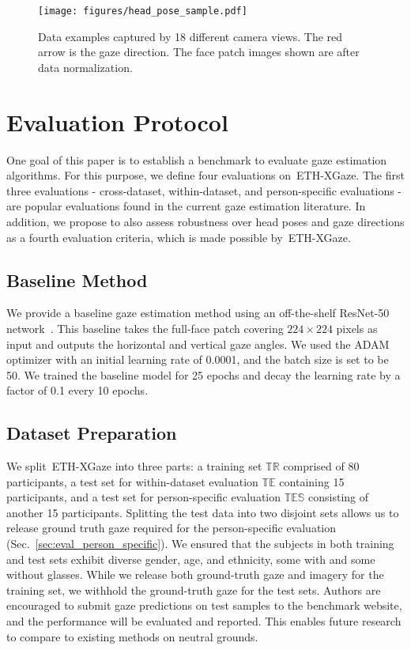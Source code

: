 \documentclass[runningheads]{llncs}
\newcommand{\datasetname}{ETH-XGaze\xspace}
\begin{document}
\begin{figure}[t]
    \centering
    \texttt{[image: figures/head\_pose\_sample.pdf]}
    \caption{Data examples captured by 18 different camera views. The red arrow is the gaze direction. The face patch images shown are after data normalization.}
    \label{fig:head_pose_sample}
\end{figure} \section{Evaluation Protocol}
One goal of this paper is to establish a benchmark to evaluate gaze estimation algorithms.
For this purpose, we define four evaluations on~\datasetname.
The first three evaluations - cross-dataset, within-dataset, and person-specific evaluations - are popular evaluations found in the current gaze estimation literature. In addition, we propose to also assess robustness over head poses and gaze directions as a fourth evaluation criteria, which is made possible by~\datasetname.

\subsection{Baseline Method}
We provide a baseline gaze estimation method using an off-the-shelf ResNet-50 network~\cite{he2016deep}.
This baseline takes the full-face patch covering $224\times224$ pixels as input and outputs the horizontal and vertical gaze angles.
We used the ADAM~\cite{kingma2014adam} optimizer with an initial learning rate of 0.0001, and the batch size is set to be 50.
We trained the baseline model for 25 epochs and decay the learning rate by a factor of 0.1 every 10 epochs.

\subsection{Dataset Preparation}
We split~\datasetname into three parts: a training set $\mathbb{TR}$ comprised of 80 participants, a test set for within-dataset evaluation $\mathbb{TE}$ containing 15 participants, and a test set for person-specific evaluation $\mathbb{TES}$ consisting of another 15 participants. Splitting the test data into two disjoint sets allows us to release ground truth gaze required for the person-specific evaluation (Sec.~\ref{sec:eval_person_specific}).
We ensured that the subjects in both training and test sets exhibit diverse gender, age, and ethnicity, some with and some without glasses. While we release both ground-truth gaze and imagery for the training set, we withhold the ground-truth gaze for the test sets. Authors are encouraged to submit gaze predictions on test samples to the benchmark website, and the performance will be evaluated and reported. This enables future research to compare to existing methods on neutral grounds.
\end{document}
